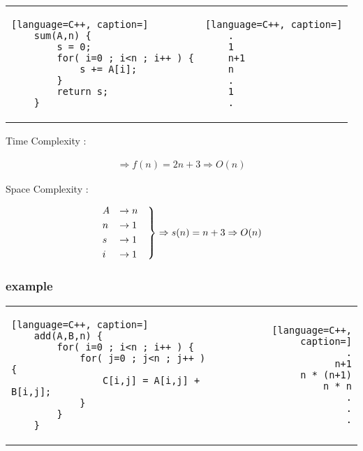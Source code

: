 \documentclass[12pt]{article}
\begin{document}
\begin{center}
  \bgroup
  \def\arraystretch{1.5}%
  \begin{tabular}{ H  G  }
	\begin{lstlisting}[language=C++, caption=]
	sum(A,n) {
		s = 0;
		for( i=0 ; i<n ; i++ ) {
			s += A[i];
		}
		return s;
	}
	\end{lstlisting}
     &  
	\begin{lstlisting}[language=C++, caption=]
	.
	1
	n+1
	n
	.
	1
	.
	\end{lstlisting}
  \end{tabular}
  \egroup
\end{center}


Time Complexity :

\begin{align*}
\Rightarrow f(n) = 2n + 3 \Rightarrow O(n)
\end{align*}



Space Complexity :


\begin{align*}
\begin{rcases}
A &\to n \quad \\
n &\to 1 \\
s &\to 1 \\
i &\to 1 
\end{rcases}
\Rightarrow s(n) = n + 3 \Rightarrow O(n)
\end{align*}







\subsubsection{example}




\begin{center}
  \bgroup
  \def\arraystretch{1.5}%
  \begin{tabular}{ E  D  }
	\begin{lstlisting}[language=C++, caption=]
	add(A,B,n) {
		for( i=0 ; i<n ; i++ ) {
			for( j=0 ; j<n ; j++ ) {
				C[i,j] = A[i,j] + B[i,j];
			}
		}
	}
	\end{lstlisting}
     &  
	\begin{lstlisting}[language=C++, caption=]
	.
	n+1
	n * (n+1)
	n * n
	.
	.
	.
	\end{lstlisting}
  \end{tabular}
  \egroup
\end{center}
\end{document}
